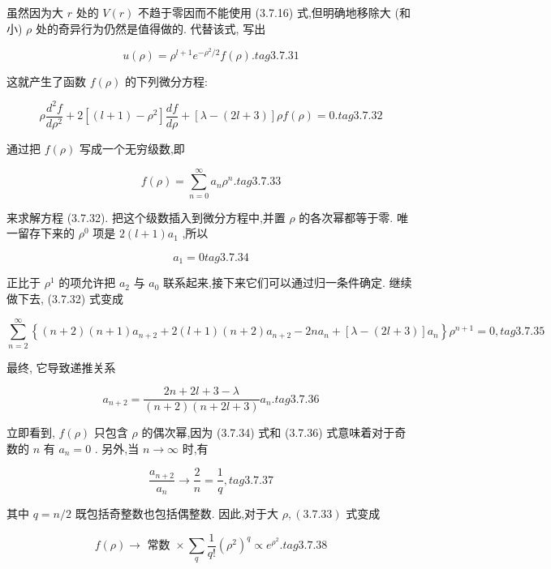 虽然因为大 $r$ 处的 $V\left( r\right)$ 不趋于零因而不能使用 (3.7.16) 式,但明确地移除大 (和小) $\rho$ 处的奇异行为仍然是值得做的. 代替该式, 写出

$$
u\left( \rho \right) = {\rho }^{l + 1}{e}^{-{\rho }^{2}/2}f\left( \rho \right) . tag{3. 7.31}
$$

这就产生了函数 $f\left( \rho \right)$ 的下列微分方程:

$$
\rho \frac{{d}^{2}f}{d{\rho }^{2}} + 2\left\lbrack {\left( {l + 1}\right) - {\rho }^{2}}\right\rbrack \frac{df}{d\rho } + \left\lbrack {\lambda - \left( {{2l} + 3}\right) }\right\rbrack {\rho f}\left( \rho \right) = 0. tag{3. 7.32}
$$

通过把 $f\left( \rho \right)$ 写成一个无穷级数,即

$$
f\left( \rho \right) = \mathop{\sum }\limits_{{n = 0}}^{\infty }{a}_{n}{\rho }^{n}. tag{3. 7.33}
$$

来求解方程 (3.7.32). 把这个级数插入到微分方程中,并置 $\rho$ 的各次幂都等于零. 唯一留存下来的 ${\rho }^{0}$ 项是 $2\left( {l + 1}\right) {a}_{1}$ ,所以

$$
{a}_{1} = 0 tag{3. 7.34}
$$

正比于 ${\rho }^{1}$ 的项允许把 ${a}_{2}$ 与 ${a}_{0}$ 联系起来,接下来它们可以通过归一条件确定. 继续做下去, (3.7.32) 式变成

$$
\mathop{\sum }\limits_{{n = 2}}^{\infty }\left\{ {\left( {n + 2}\right) \left( {n + 1}\right) {a}_{n + 2} + 2\left( {l + 1}\right) \left( {n + 2}\right) {a}_{n + 2} - {2n}{a}_{n} + \left\lbrack {\lambda - \left( {{2l} + 3}\right) }\right\rbrack {a}_{n}}\right\} {\rho }^{n + 1} = 0, tag{3. 7.35}
$$

最终, 它导致递推关系

$$
{a}_{n + 2} = \frac{{2n} + {2l} + 3 - \lambda }{\left( {n + 2}\right) \left( {n + {2l} + 3}\right) }{a}_{n}. tag{3. 7.36}
$$

立即看到, $f\left( \rho \right)$ 只包含 $\rho$ 的偶次幂,因为 (3.7.34) 式和 (3.7.36) 式意味着对于奇数的 $n$ 有 ${a}_{n} = 0$ . 另外,当 $n \rightarrow \infty$ 时,有

$$
\frac{{a}_{n + 2}}{{a}_{n}} \rightarrow \frac{2}{n} = \frac{1}{q}, tag{3. 7.37}
$$

其中 $q = n/2$ 既包括奇整数也包括偶整数. 因此,对于大 $\rho ,\left( {3.7.33}\right)$ 式变成

$$
f\left( \rho \right) \rightarrow \text{ 常数 } \times \mathop{\sum }\limits_{q}\frac{1}{q!}{\left( {\rho }^{2}\right) }^{q} \propto {e}^{{\rho }^{2}}. tag{3. 7.38}
$$

